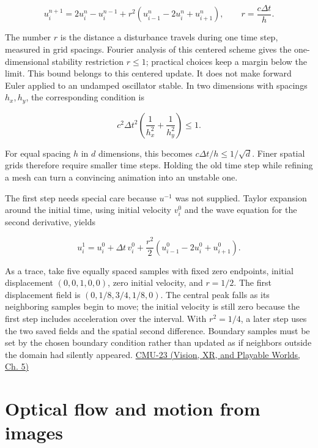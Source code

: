 \[
u_i^{n+1}=2u_i^n-u_i^{n-1}+r^2(u_{i-1}^n-2u_i^n+u_{i+1}^n),\qquad r=\frac{c\Delta t}{h}.
\]

The number \(r\) is the distance a disturbance travels during one time step, measured in grid spacings. Fourier analysis of this centered scheme gives the one-dimensional stability restriction \(r\leq1\); practical choices keep a margin below the limit. This bound belongs to this centered update. It does not make forward Euler applied to an undamped oscillator stable. In two dimensions with spacings \(h_x,h_y\), the corresponding condition is

\[
c^2\Delta t^2\left(\frac1{h_x^2}+\frac1{h_y^2}\right)\leq1.
\]

For equal spacing \(h\) in \(d\) dimensions, this becomes \(c\Delta t/h\leq1/\sqrt d\). Finer spatial grids therefore require smaller time steps. Holding the old time step while refining a mesh can turn a convincing animation into an unstable one.

The first step needs special care because \(u^{-1}\) was not supplied. Taylor expansion around the initial time, using initial velocity \(v_i^0\) and the wave equation for the second derivative, yields

\[
u_i^1=u_i^0+\Delta t\,v_i^0+\frac{r^2}{2}(u_{i-1}^0-2u_i^0+u_{i+1}^0).
\]

As a trace, take five equally spaced samples with fixed zero endpoints, initial displacement \((0,0,1,0,0)\), zero initial velocity, and \(r=1/2\). The first displacement field is \((0,1/8,3/4,1/8,0)\). The central peak falls as its neighboring samples begin to move; the initial velocity is still zero because the first step includes acceleration over the interval. With \(r^2=1/4\), a later step uses the two saved fields and the spatial second difference. Boundary samples must be set by the chosen boundary condition rather than updated as if neighbors outside the domain had silently appeared. \href{../07-Vision-XR-and-Playable-Worlds/main.pdf\#nameddest=04-visual-computing-ii-ch036-cmu-23---physically-based-animation-and-pdes}{CMU-23 (Vision, XR, and Playable Worlds, Ch. 5)}

\section{Optical flow and motion from images}\label{04-visual-computing-ii-ch030-optical-flow-and-motion-from-images}

\hypertarget{04-visual-computing-ii-ch030-optical-flow-and-motion-from-images}{}

